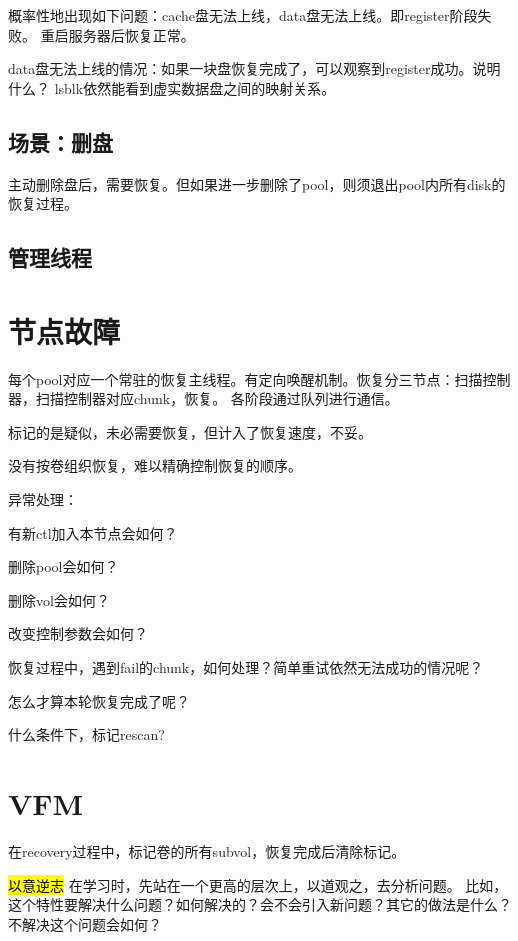 概率性地出现如下问题：cache盘无法上线，data盘无法上线。即register阶段失败。
重启服务器后恢复正常。

data盘无法上线的情况：如果一块盘恢复完成了，可以观察到register成功。说明什么？
lsblk依然能看到虚实数据盘之间的映射关系。

\subsection{场景：删盘}

主动删除盘后，需要恢复。但如果进一步删除了pool，则须退出pool内所有disk的恢复过程。

\subsection{管理线程}

\section{节点故障}

每个pool对应一个常驻的恢复主线程。有定向唤醒机制。恢复分三节点：扫描控制器，扫描控制器对应chunk，恢复。
各阶段通过队列进行通信。

标记的是疑似，未必需要恢复，但计入了恢复速度，不妥。

没有按卷组织恢复，难以精确控制恢复的顺序。

异常处理：
\begin{enumbox}
\item 有新ctl加入本节点会如何？
\item 删除pool会如何？
\item 删除vol会如何？
\item 改变控制参数会如何？
\item 恢复过程中，遇到fail的chunk，如何处理？简单重试依然无法成功的情况呢？
\item 怎么才算本轮恢复完成了呢？
\item 什么条件下，标记rescan?
\end{enumbox}

\section{VFM}

在recovery过程中，标记卷的所有subvol，恢复完成后清除标记。

\hl{以意逆志} 在学习时，先站在一个更高的层次上，以道观之，去分析问题。
比如，这个特性要解决什么问题？如何解决的？会不会引入新问题？其它的做法是什么？
不解决这个问题会如何？

